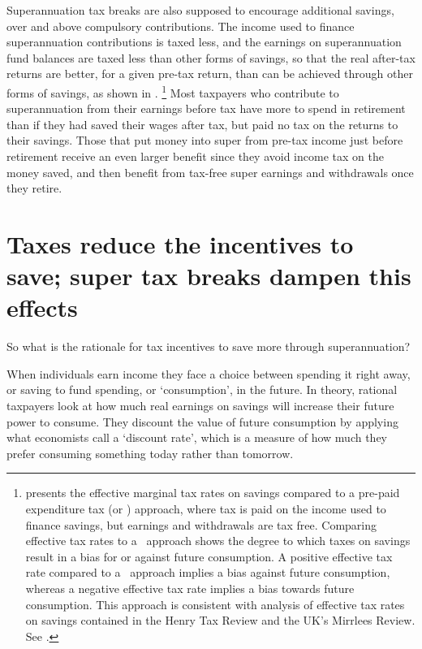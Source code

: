 Superannuation tax breaks are also supposed to encourage additional savings, over and above compulsory contributions. The income used to finance superannuation contributions is taxed less, and the earnings on superannuation fund balances are taxed less than other forms of savings, so that the real after-tax returns are better, for a given pre-tax return, than can be achieved through other forms of savings, as shown in .%
%
\footnote{%
 presents the effective marginal tax rates on savings compared to a pre-paid expenditure tax (or \TEE) approach, where tax is paid on the income used to finance savings, but earnings and withdrawals are tax free. Comparing effective tax rates to a \TEE\ approach shows the degree to which taxes on savings result in a bias for or against future consumption. A positive effective tax rate compared to a \TEE\ approach implies a bias against future consumption, whereas a negative effective tax rate implies a bias towards future consumption. This approach is consistent with analysis of effective tax rates on savings contained in the Henry Tax Review and the UK’s Mirrlees Review. 
See \textcites{HenryTaxReview2010}{Wakefield2009}[][322]{MirrleesAdamBesleyEtAl2011}.%
}
%  
Most taxpayers who contribute to superannuation from their earnings before tax have more to spend in retirement than if they had saved their wages after tax, but paid no tax on the returns to their savings. Those that put money into super from pre-tax income just before retirement receive an even larger benefit since they avoid income tax on the money saved, and then benefit from tax-free super earnings and withdrawals once they retire.

\section{Taxes reduce the incentives to save; super tax breaks dampen this effects}\label{sec:SUPER-2-5}
So what is the rationale for tax incentives to save more through superannuation?

When individuals earn income they face a choice between spending it right away, or saving to fund spending, or ‘consumption’, in the future. In theory, rational taxpayers look at how much real earnings on savings will increase their future power to consume. They discount the value of future consumption by applying what economists call a ‘discount rate’, which is a measure of how much they prefer consuming something today rather than tomorrow. 

